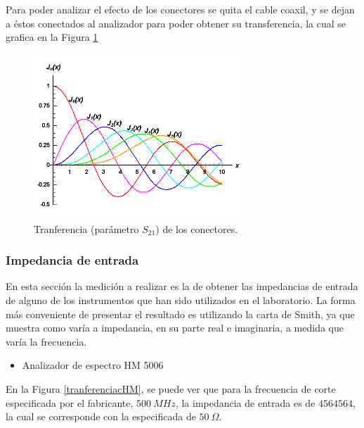 \documentclass[a4paper,10pt]{article}
\begin{document}
		\indent Para poder analizar el efecto de los conectores se quita el 
		cable coaxil, y se dejan a \'estos conectados al analizador para poder 
		obtener su transferencia, la cual se grafica en la Figura 
		\ref{tranferenciaconectorrr}
		
		\begin{figure}[!htb]
			\centering
			\includegraphics[width=8cm]
			{Imagenes/bessel.png}
			\caption{Tranferencia (par\'ametro $S_{21}$) de los conectores.}
			\label{tranferenciaconectorrr} 
		\end{figure}
		
		\subsubsection{Impedancia de entrada}
		\indent En esta secci\'on la medici\'on a realizar es la de obtener las 
		impedancias de entrada de alguno de los instrumentos que han sido 
		utilizados en el laboratorio. La forma m\'as conveniente de presentar el
		resultado es utilizando la carta de Smith, ya que muestra como var\'ia a
		impedancia, en su parte real e  imaginaria, a medida que var\'ia la 
		frecuencia.
		
		\begin{itemize}
			\item Analizador de espectro HM 5006
		\end{itemize}
		
		\indent En la Figura \ref*{tranferenciacHM}, se puede ver que para la 
		frecuencia de corte especificada por el fabricante, $500~MHz$, la 
		impedancia de entrada es de $4564564$, la cual se corresponde con la 
		especificada de $50~\Omega$.
		
\end{document}
